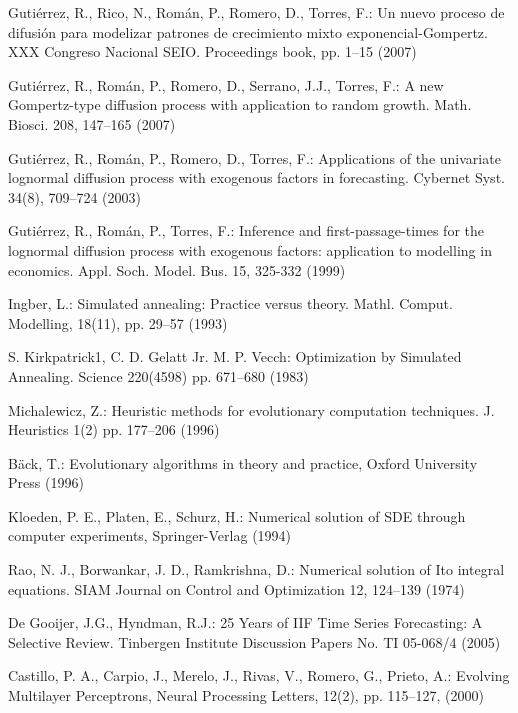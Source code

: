 \documentclass{sig-alternate}
\begin{document}
\begin{thebibliography}{10}

Guti{\'e}rrez, R., Rico, N., Rom{\'a}n, P., Romero, D., Torres, F.:
Un nuevo proceso de difusi{\'o}n para modelizar patrones de crecimiento mixto exponencial-Gompertz. XXX Congreso Nacional SEIO. Proceedings book, pp. 1--15 (2007)

Guti{\'e}rrez, R., Rom{\'a}n, P., Romero, D., Serrano, J.J.,  Torres, F.:
A new Gompertz-type diffusion process with application to random growth. Math. Biosci. 208, 147--165 (2007)

Guti{\'e}rrez, R., Rom{\'a}n, P., Romero, D., Torres, F.:
Applications of the univariate lognormal diffusion process with exogenous factors in forecasting. {Cybernet Syst.} {34}(8), 709--724 (2003)

 Guti{\'e}rrez, R., Rom{\'a}n, P., Torres, F.:
Inference and first-passage-times for the lognormal diffusion process with exogenous factors: application to modelling
in economics. Appl. Soch. Model. Bus. {15}, 325-332 (1999)

Ingber, L.: 
Simulated annealing: Practice versus theory. Mathl. Comput. Modelling, 18(11), pp. 29--57 (1993)

S. Kirkpatrick1, C. D. Gelatt Jr. M. P. Vecch:
Optimization by Simulated Annealing. Science 220(4598) pp. 671--680 (1983)

Michalewicz, Z.:
Heuristic methods for evolutionary computation techniques. J. Heuristics 1(2) pp. 177--206 (1996)

B{\"{a}}ck, T.:
Evolutionary algorithms in theory and practice, Oxford University Press (1996)

Kloeden, P. E., Platen, E., Schurz, H.:
Numerical solution of SDE through computer experiments, {Springer-Verlag} (1994)

Rao, N. J., Borwankar, J. D., Ramkrishna, D.:
Numerical solution of Ito integral equations. {SIAM Journal on Control and Optimization} {12}, 124--139 (1974)

De Gooijer, J.G., Hyndman, R.J.:
25 Years of IIF Time Series Forecasting: A Selective Review. Tinbergen Institute Discussion Papers No. TI 05-068/4  (2005)

Castillo, P. A., Carpio, J., Merelo, J., Rivas, V., Romero, G., Prieto, A.: 
Evolving Multilayer Perceptrons, Neural Processing Letters, 12(2), pp. 115--127, (2000)


\end{thebibliography}
\end{document}

